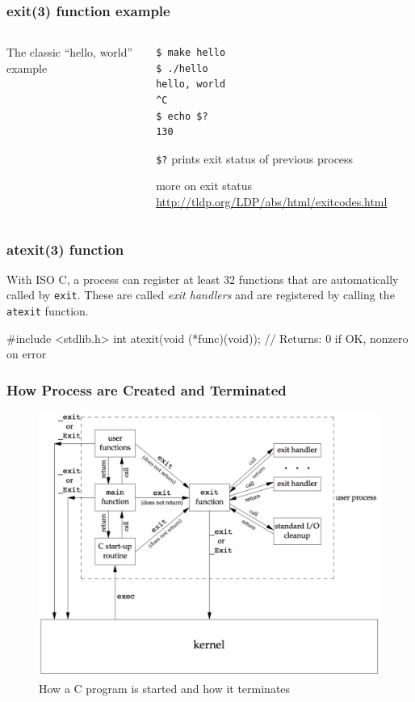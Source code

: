 \documentclass[newPxFont,sthlmFooter,nooffset]{beamer}
\begin{document}
\begin{frame}[containsverbatim,t]
  \frametitle{exit(3) function example}
\bigskip
  \begin{columns}
    \begin{column}{0.45\linewidth}
      The classic ``hello, world'' example
      
    \end{column}
    \begin{column}{0.5\linewidth}
\begin{verbatim}
$ make hello
$ ./hello
hello, world
^C
$ echo $?      
130             
\end{verbatim}
\texttt{\$?} prints exit status of previous process

      more on exit status
      \url{http://tldp.org/LDP/abs/html/exitcodes.html}
    \end{column}
  \end{columns}
\end{frame}

\begin{frame}[containsverbatim,t]
  \frametitle{atexit(3) function}
With ISO C, a process can register at least 32 functions that are automatically called by
\texttt{exit}. These are called \textit{exit handlers} and are registered by calling the \texttt{atexit} function.

\begin{codedef}
#include <stdlib.h>
int atexit(void (*func)(void));
// Returns: 0 if OK, nonzero on error    
\end{codedef}


\end{frame}


\begin{frame}[t]
  \frametitle{How Process are Created and Terminated}

\begin{figure}[h]
  \centering
  \includegraphics[height=0.85\textheight]{figure/fig7-2_how_prog.png}
  \caption{How a C program is started and how it terminates}
\end{figure}
\end{frame}
\end{document}
